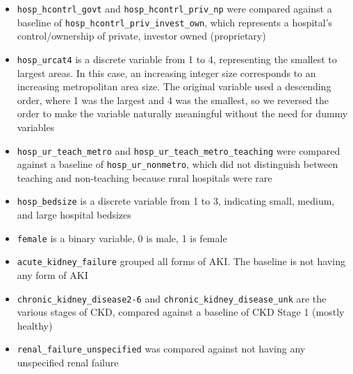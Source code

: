 \documentclass[12pt]{ociamthesis}\usepackage[]{graphicx}\usepackage[]{color}
\begin{document}
\begin{itemize}
  \item \texttt{hosp\_hcontrl\_govt} and \texttt{hosp\_hcontrl\_priv\_np} were compared against a baseline of 
        \texttt{hosp\_hcontrl\_priv\_invest\_own}, which represents a hospital's control/ownership of private, investor owned (proprietary)
  \item \texttt{hosp\_urcat4} is a discrete variable from 1 to 4, representing the smallest to largest areas. In this case, an increasing integer
        size corresponds to an increasing metropolitan area size. The original variable used a descending order, where 1 was the largest and 4 was the
        smallest, so we reversed the order to make the variable naturally meaningful without the need for dummy variables
  \item \texttt{hosp\_ur\_teach\_metro} and \texttt{hosp\_ur\_teach\_metro\_teaching} were compared against a baseline of \texttt{hosp\_ur\_nonmetro}, 
        which did not distinguish between teaching and non-teaching because rural hospitals  were rare 
  \item \texttt{hosp\_bedsize} is a discrete variable from 1 to 3, indicating small, medium, and large hospital bedsizes
  \item \texttt{female} is a binary variable, 0 is male, 1 is female
  \item \texttt{acute\_kidney\_failure} grouped all forms of AKI. The baseline is not having any form of AKI
  \item \texttt{chronic\_kidney\_disease2-6} and \texttt{chronic\_kidney\_disease\_unk} are the various stages of CKD, compared against a baseline of CKD Stage 1 (mostly healthy)
  \item \texttt{renal\_failure\_unspecified} was compared against not having any unspecified renal failure
\end{itemize}
\end{document}
